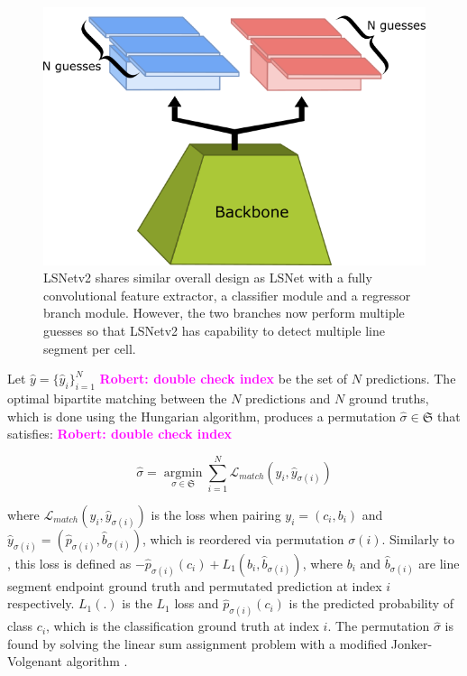 \documentclass[journal]{IEEEtran}
\newcommand{\commentR}[1]{\textbf{\textcolor{magenta}{Robert: #1}}}
\begin{document}
\begin{figure}
  \includegraphics[width=\linewidth]{imgs/others/lsnet_arch.png}
  \caption{LSNetv2 shares similar overall design as LSNet with a fully convolutional feature extractor, a classifier module and a regressor branch module. However, the two branches now perform multiple guesses so that LSNetv2 has capability to detect multiple line segment per cell.}
  \label{lsnet_architecture}
\end{figure}

Let $\hat{y}=\{\hat{y}_i\}^N_{i=1}$ \commentR{double check index} be the set of $N$ predictions. The optimal bipartite matching between the $N$ predictions and $N$ ground truths, which is done using the Hungarian algorithm, produces a permutation $\hat{\sigma} \in \mathfrak{S}$ that satisfies: \commentR{double check index}

\begin{equation} \label{bipartite_eqn}
\hat{\sigma} = \mathop{\arg \min}\limits_{\sigma \in \mathfrak{S}} \sum_{i=1}^N \mathcal{L}_{match} (y_i, \hat{y}_{\sigma(i)})
\end{equation}

\noindent where $\mathcal{L}_{match} (y_i, \hat{y}_{\sigma(i)})$ is the loss when pairing $y_i = (c_i, b_i)$ and $\hat{y}_{\sigma(i)} = (\hat{p}_{\sigma(i)}, \hat{b}_{\sigma(i)})$, which is reordered via permutation $\sigma(i)$. Similarly to \cite{DETR}, this loss is defined as $-\hat{p}_{\sigma(i)}(c_i) + L_1(b_i, \hat{b}_{\sigma(i)})$, where $b_i$ and $\hat{b}_{\sigma(i)}$ are line segment endpoint ground truth and permutated prediction at index $i$ respectively. $L_1(.)$ is the $L_1$ loss and $\hat{p}_{\sigma(i)}(c_i)$ is the predicted probability of class $c_i$, which is the classification ground truth at index $i$. The permutation $\hat{\sigma}$ is found by solving the linear sum assignment problem with a modified Jonker-Volgenant algorithm \cite{7738348}.
\end{document}
